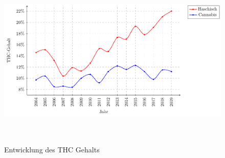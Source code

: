 \documentclass[../main.tex]{subfiles}
\begin{document}
	\noindent	 
	\begin{figure}[H]
		\centering
		\includegraphics[height=8.5cm]{../figures/thc-statistic}
		\captionsetup{font=small}
		\caption[Entwicklung des THC Gehalts]{Entwicklung des THC Gehalts\protect\footnotemark}		
		\label{fig:thcdevelopment}
	\end{figure}
	
	
	
\end{document}
